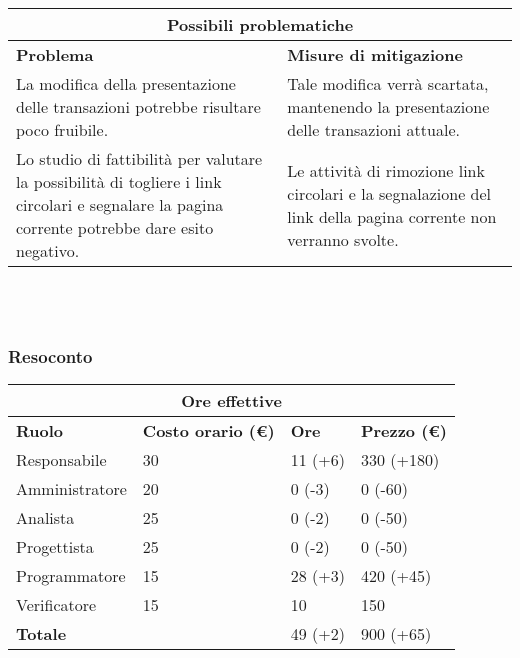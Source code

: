 \documentclass[a4paper, 12pt]{article}
\begin{document}
\begin{center}
    \begin{tabularx}{\textwidth}{|X|X|}
        \hline
        \multicolumn{2}{|c|}{\textbf{Possibili problematiche}}\\
        \hline
        \hline
        \textbf{Problema} & \textbf{Misure di mitigazione}\\
        \hline
        La modifica della presentazione delle transazioni potrebbe risultare poco fruibile. & Tale modifica verrà scartata, mantenendo la presentazione delle transazioni attuale.\\
        \hline
        Lo studio di fattibilità per valutare la possibilità di togliere i link circolari e segnalare la pagina corrente potrebbe dare esito negativo. & Le attività di rimozione link circolari e la segnalazione del link della pagina corrente non verranno svolte.\\
        \hline
    \end{tabularx}\\[8pt]
    \mbox{}\\
\end{center}

\subsubsection{Resoconto}\mbox{}

\begin{center}
    \begin{tabularx}{\textwidth}{|X|X|X|X|}
        \hline
        \multicolumn{4}{|c|}{\textbf{Ore effettive}}\\
        \hline
        \hline
        \textbf{Ruolo} & \textbf{Costo orario (\euro)} & \textbf{Ore} & \textbf{Prezzo (\euro)}\\
        \hline
        Responsabile    & 30 & 11 (+6)  & 330 (+180) \\
        \hline
        Amministratore  & 20 & 0 (-3)  &  0 (-60) \\
        \hline
        Analista        & 25 & 0 (-2)  & 0 (-50) \\
        \hline
        Progettista     & 25 & 0 (-2) & 0 (-50) \\
        \hline
        Programmatore   & 15 & 28 (+3)  & 420 (+45) \\
        \hline
        Verificatore    & 15 & 10 &  150 \\
        \hline
        \hline
        \textbf{Totale} &    & 49 (+2) & 900 (+65)\\
        \hline
    \end{tabularx}\\[8pt]
    \mbox{}\\
\end{center}
\end{document}
